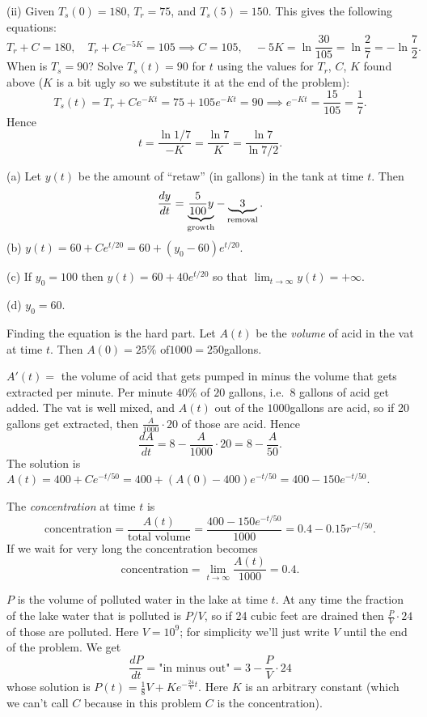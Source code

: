 \item[{\bfseries(III11.4c)}]

(ii) Given $T_s(0) = 180$, $T_r=75$, and $T_s(5) = 150$. This gives the following
equations:
\[
T_r + C = 180, \quad T_r + Ce^{-5K} = 105
\implies C= 105, \quad -5K = \ln\frac{30}{105} =\ln\frac{2}{7}=-\ln\frac72.
\]
When is $T_s=90$?  Solve $T_s(t) = 90$ for $t$ using the values for $T_r$, $C$, $K$
found above ($K$ is a bit ugly so we substitute it at the end of the
problem):
\[
T_s(t) = T_r+Ce^{-Kt} = 75+105 e^{-Kt} = 90 \implies e^{-Kt} =
\frac{15}{105} = \frac{1}{7}.
\]
Hence
\[
t = \frac{\ln 1/7}{-K} = \frac{\ln 7}{K} = \frac{\ln 7}{\ln 7/2}.
\]

\bigskip

\item[{\bfseries(III11.6)}]
(a) Let $y(t)$ be the amount of ``retaw'' (in gallons) in the tank at time
$t$.  Then
\[
\frac{dy}{dt} = \underbrace{\frac{5}{100}y}_{\rm growth}
- \underbrace{\quad3\quad}_{\rm removal}.
\]
(b) $y(t) = 60+ Ce^{t/20} = 60+(y_0 - 60)e^{t/20}$.

(c) If $y_0 = 100$ then $y(t) = 60 + 40 e^{t/20}$ so that
$\lim_{t\to\infty} y(t) = +\infty$.

(d) $y_0 = 60$.
\bigskip

\item[{\bfseries(III11.7)}]
Finding the equation is the hard part.  Let $A(t)$ be the
\emph{volume} of acid in the vat at time $t$.  Then $A(0) = 25\%\text{ of
}1000 = 250$gallons.

$A'(t) = $ the volume of acid that gets pumped in minus the volume that gets
extracted per minute.  Per minute $40\%$ of $20$ gallons, i.e.\ 8 gallons of
acid get added.  The vat is well mixed, and $A(t)$ out of the $1000$gallons
are acid, so if 20 gallons get extracted, then $\frac{A}{1000}\cdot20$ of
those are acid.  Hence
\[
\frac{dA}{dt} = 8 - \frac{A}{1000}\cdot20 = 8-\frac{A}{50}.
\]
The solution is $A(t) = 400 + Ce^{-t/50} = 400 + (A(0)-400)e^{-t/50} = 400
-150 e^{-t/50}$.

The \emph{concentration} at time $t$ is
\[
\text{concentration} = \frac{A(t)}{\text{total volume}} =
\frac{400 - 150e^{-t/50}}{1000} = 0.4 - 0.15 r^{-t/50}.
\]
If we wait for very long the concentration becomes
\[
\text{concentration} = \lim_{t\to\infty} \frac{A(t)}{1000} = 0.4.
\]
\bigskip

\item[{\bfseries(III11.8c)}]
$P$ is the volume of polluted water in the lake at time $t$.
At any time the fraction of the lake water that is polluted is $P/V$, so if
24 cubic feet are drained then $\frac{P}{V}\cdot24$ of those are polluted.
Here $V=10^9$; for simplicity we'll just write $V$ until the end of the
problem. We get
\[
\frac{dP}{dt} = \text{"in minus out"}
= 3 - \frac{P}{V} \cdot 24
\]
whose solution is $P(t) = \frac{1}{8}V+Ke^{-\frac{24}{V}t}$.  Here
$K$ is an arbitrary constant (which we can't call $C$ because in this
problem $C$ is the concentration).

